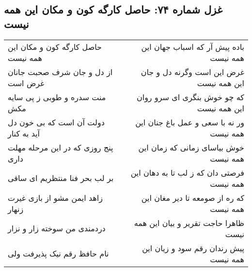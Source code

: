 \begin{center}
\section*{غزل شماره ۷۴: حاصل کارگه کون و مکان این همه نیست}
\label{sec:sh074}
\begin{longtable}{l p{0.5cm} r}
حاصل کارگه کون و مکان این همه نیست
&&
باده پیش آر که اسباب جهان این همه نیست
\\
از دل و جان شرف صحبت جانان غرض است
&&
غرض این است وگرنه دل و جان این همه نیست
\\
منت سدره و طوبی ز پی سایه مکش
&&
که چو خوش بنگری ای سرو روان این همه نیست
\\
دولت آن است که بی خون دل آید به کنار
&&
ور نه با سعی و عمل باغ جنان این همه نیست
\\
پنج روزی که در این مرحله مهلت داری
&&
خوش بیاسای زمانی که زمان این همه نیست
\\
بر لب بحر فنا منتظریم ای ساقی
&&
فرصتی دان که ز لب تا به دهان این همه نیست
\\
زاهد ایمن مشو از بازی غیرت زنهار
&&
که ره از صومعه تا دیر مغان این همه نیست
\\
دردمندی من سوخته زار و نزار
&&
ظاهرا حاجت تقریر و بیان این همه نیست
\\
نام حافظ رقم نیک پذیرفت ولی
&&
پیش رندان رقم سود و زیان این همه نیست
\\
\end{longtable}
\end{center}
